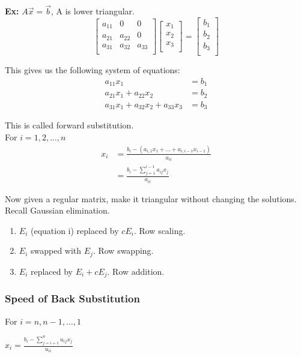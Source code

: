 \documentclass[12pt, letterpaper]{article}
\begin{document}
\noindent \textbf{Ex: } $A\vec{x} = \vec{b}$, A is lower triangular.
\[
\begin{bmatrix}
    a_{11} & 0 & 0 \\
    a_{21} & a_{22} & 0 \\
    a_{31} & a_{32} & a_{33} \\
\end{bmatrix}
\begin{bmatrix}
    x_1 \\
    x_2 \\
    x_3 \\
\end{bmatrix}
=
\begin{bmatrix}
    b_1 \\
    b_2 \\ 
    b_3 \\
\end{bmatrix}
\]

This gives us the following system of equations:
\begin{align*}
a_{11}x_1 &= b_1 \\
a_{21}x_1 + a_{22}x_2 &= b_2 \\
a_{31}x_1 + a_{32}x_2 + a_{33}x_3 &= b_3
\end{align*}

\noindent This is called forward substitution. \\
For $i = 1,2,\ldots, n$
\begin{align*}
x_i&=\frac{b_i-(a_{i,1}x_{1}+\ldots+a_{i,i-1}x_{i-1})}{a_{ii}} \\
&= \frac{b_i - \displaystyle\sum_{j=1}^{i-1} a_{ij}x_j}{a_{ii}}
\end{align*}

\noindent Now given a regular matrix, make it triangular without changing the solutions. Recall Gaussian elimination.
\begin{enumerate}
    \item $E_i$ (equation i) replaced by $cE_i$. Row scaling.
    \item $E_i$ swapped with $E_j$. Row swapping.
    \item $E_i$ replaced by $E_i + cE_j$. Row addition.
\end{enumerate}

\subsubsection{Speed of Back Substitution}
For $i=n,n-1,\ldots, 1$

$x_i = \frac{b_i-\displaystyle\sum^n_{j=i+1}u_{ij}x_j}{u_{ii}}$
 
\end{document}
